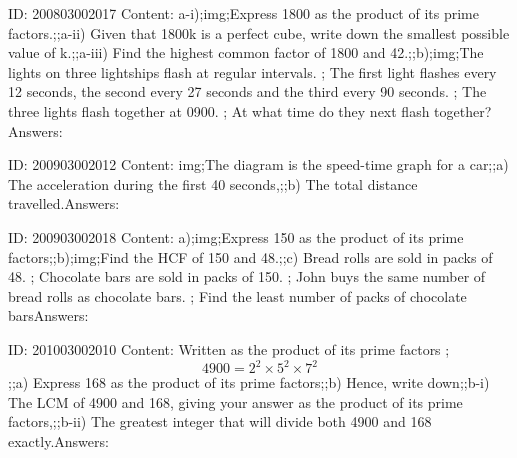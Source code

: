 \documentclass{article}
\begin{document}
ID: 200803002017
Content:
a-i);img;Express 1800 as the product of its prime factors.;;a-ii) Given that 1800k is a perfect cube, write down the smallest possible value of k.;;a-iii) Find the highest common factor of 1800 and 42.;;b);img;The lights on three lightships flash at regular intervals. ; The first light flashes every 12 seconds, the second every 27 seconds and the third every 90 seconds. ; The three lights flash together at 0900. ; At what time do they next flash together?Answers:

ID: 200903002012
Content:
img;The diagram is the speed-time graph for a car;;a) The acceleration during the first 40 seconds,;;b) The total distance travelled.Answers:

ID: 200903002018
Content:
a);img;Express 150 as the product of its prime factors;;b);img;Find the HCF of 150 and 48.;;c) Bread rolls are sold in packs of 48. ; Chocolate bars are sold in packs of 150. ; John buys the same number of bread rolls as chocolate bars. ; Find the least number of packs of chocolate barsAnswers:

ID: 201003002010
Content:
Written as the product of its prime factors ; $$4900 = 2^2 \times 5^2 \times 7^2$$;;a) Express 168 as the product of its prime factors;;b) Hence, write down;;b-i) The LCM of 4900 and 168, giving your answer as the product of its prime factors,;;b-ii) The greatest integer that will divide both 4900 and 168 exactly.Answers:
\end{document}
